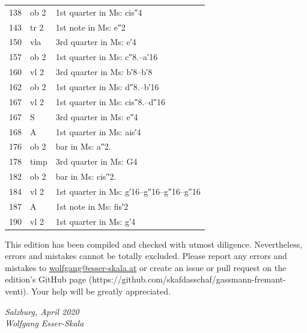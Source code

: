\documentclass[parskip=full]{scrreprt}
\newif\iftemplate\templatetrue
\begin{document}
\begin{longtable}{ll L{10cm}}
	138   & ob 2  & 1st quarter in Ms: cis″4 \\
	143   & tr 2  & 1st note in Ms: e″2 \\
	150   & vla   & 3rd quarter in Ms: e′4 \\
	157   & ob 2  & 1st quarter in Ms: c″8.–a′16 \\
	160   & vl 2  & 3rd quarter in Ms: b′8–b′8 \\
	162   & ob 2  & 1st quarter in Ms: d″8.–b′16 \\
	167   & vl 2  & 1st quarter in Ms: cis″8.–d″16 \\
	167   & S     & 3rd quarter in Ms: e″4 \\
	168   & A     & 1st quarter in Ms: ais′4 \\
	176   & ob 2  & bar in Ms: a″2. \\
	178   & timp  & 3rd quarter in Ms: G4 \\
	182   & ob 2  & bar in Ms: cis″2. \\
	184   & vl 2  & 1st quarter in Ms: g′16–g″16–g″16–g″16 \\
	187   & A     & 1st note in Ms: fis′2 \\
	190   & vl 2  & 1st quarter in Ms: g′4 \\
	\bottomrule
\end{longtable}


This edition has been compiled and checked with utmost diligence. Nevertheless, errors and mistakes cannot be totally excluded. Please report any errors and mistakes to \url{wolfgang@esser-skala.at} or create an issue or pull request on the edition’s GitHub page (https://github.com/skafdasschaf/gassmann-fremant-venti). Your help will be greatly appreciated.

\bigskip
\textit{Salzburg, April 2020\\
Wolfgang Esser-Skala}



%

\cleardoublepage
\fi

\iftemplate

\fi
\end{document}
